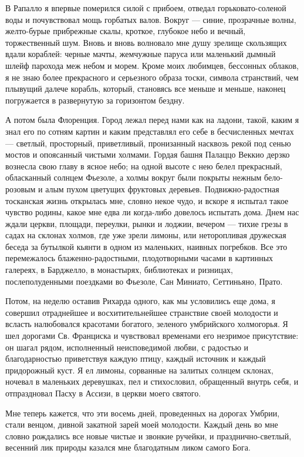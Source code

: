 В   Рапалло   я   впервые   померился   силой   с   прибоем,   отведал
горьковато-соленой  воды и  почувствовал мощь  горбатых валов.  Вокруг
--- синие,  прозрачные волны,  желто-бурые прибрежные  скалы, кроткое,
глубокое небо и вечный, торжественный шум. Вновь и вновь волновало мне
душу  зрелище  скользящих  вдали  кораблей:  черные  мачты,  жемчужные
паруса или  маленький дымный шлейф  парохода меж небом и  морем. Кроме
моих  любимцев,  бессонных облаков,  я  не  знаю более  прекрасного  и
серьезного  образа  тоски,  символа странствий,  чем  плывущий  далече
корабль, который, становясь все меньше и меньше, наконец погружается в
развернутую за горизонтом бездну.

А потом была  Флоренция. Город лежал перед нами как  на ладони, такой,
каким  я знал  его по  сотням картин  и каким  представлял его  себе в
бесчисленных мечтах ---  светлый, просторный, приветливый, пронизанный
насквозь рекой под  сенью мостов и опоясанный  чистыми холмами. Гордая
башня  Палаццо Веккио  дерзко вознесла  свою  главу в  ясное небо;  на
одной высоте  с нею белел  прекрасный, обласканный солнцем  Фьезоле, а
холмы вокруг  были покрыты нежным  бело-розовым и алым  пухом цветущих
фруктовых деревьев. Подвижно-радостная тосканская жизнь открылась мне,
словно некое чудо, и вскоре я  испытал такое чувство родины, какое мне
едва  ли когда-либо  довелось испытать  дома. Днем  нас ждали  церкви,
площади, переулки, рынки и лоджии, вечером  --- тихие грезы в садах на
склонах  холмов,  где уже  зрели  лимоны,  или неторопливая  дружеская
беседа за  бутылкой кьянти  в одном  из маленьких,  наивных погребков.
Все  это  перемежалось  блаженно-радостными,  плодотворными  часами  в
картинных галереях, в Барджелло, в монастырях, библиотеках и ризницах,
послеполуденными поездками во Фьезоле, Сан Миниато, Сеттиньяно, Прато.

Потом, на неделю оставив Рихарда одного, как мы условились еще дома, я
совершил  отраднейшее и  восхитительнейшее странствие  своей молодости
и  всласть   налюбовался  красотами  богатого,   зеленого  умбрийского
холмогорья. Я  шел дорогами Св.  Франциска и чувствовал  временами его
незримое присутствие: он шагал рядом, исполненный неисповедимой любви,
с радостью и благодарностью  приветствуя каждую птицу, каждый источник
и каждый придорожный  куст. Я ел лимоны, сорванные  на залитых солнцем
склонах, ночевал в маленьких деревушках, пел и стихословил, обращенный
внутрь себя, и отпраздновал Пасху в Ассизи, в церкви моего святого.

Мне  теперь  кажется, что  эти  восемь  дней, проведенных  на  дорогах
Умбрии,  стали венцом,  дивной закатной  зарей моей  молодости. Каждый
день во  мне словно рождались  все новые  чистые и звонкие  ручейки, и
празднично-светлый, весенний лик природы казался мне благодатным ликом
самого Бога.


